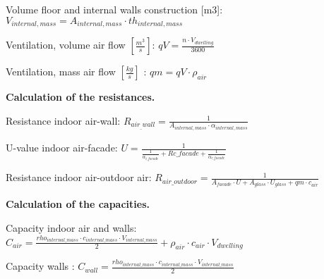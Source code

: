 \newpage
Volume floor and internal walls construction [m3]: $V_{internal,mass} = A_{internal,mass} \cdot th_{internal,mass}$

Ventilation, volume air flow $[\frac{m^3}{s}]$: $qV = \frac{n \cdot V_{dwelling}}{3600} $  

Ventilation, mass air flow $[\frac{kg}{s}]$ : $qm = qV \cdot \rho_{air} $  
\newline

\textbf{Calculation of the resistances.}
\newline

Resistance indoor air-wall: $R_{air_{\_}wall} = \frac{1}{A_{internal,mass} \cdot \alpha_{internal,mass}} $ 

U-value indoor air-facade: $U =\frac{1}{\frac{1}{\alpha_{i{\_}facade}}   + R{c{\_}facade} + \frac{1}{\alpha_{e{\_}facade}}}$ 

Resistance indoor air-outdoor air: $R_{air{\_}outdoor} = \frac{1}{A_{facade} \cdot U + A_{glass} \cdot U_{glass} + qm \cdot c_{air}}$ 
\newline

\textbf{Calculation of the capacities.}
\newline

Capacity indoor air and walls: $C_{air} =\frac{rho_{internal{\_}mass} \cdot c_{internal{\_}mass} \cdot V_{internal{\_}mass}}{2} + \rho_{air} \cdot c_{air} \cdot V_{dwelling}  $ 

Capacity walls : $C_{wall} =\frac{rho_{internal{\_}mass} \cdot c_{internal{\_}mass} \cdot V_{internal{\_}mass}}{2}$   

\newpage
  